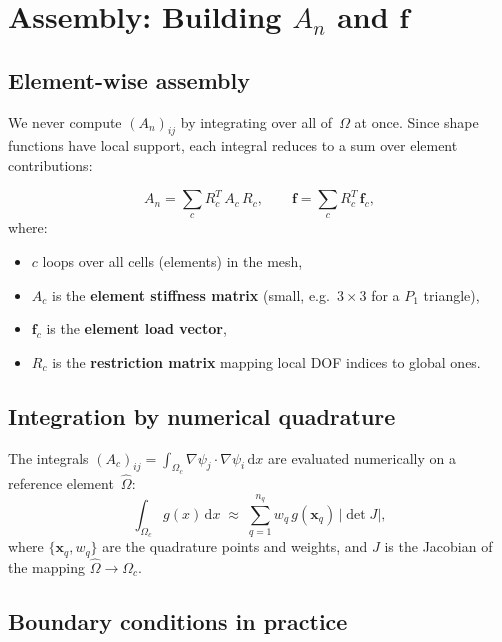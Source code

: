 \documentclass[11pt,a4paper]{article}
\theoremstyle{plain}
\theoremstyle{remark}
\newcommand{\dx}{\,\mathrm{d}x}
\let\origsubsection\subsection
\renewcommand{\subsection}{\needspace{6\baselineskip}\origsubsection}
\begin{document}
\newpage
\section{Assembly: Building $A_n$ and $\mathbf{f}$}
\label{sec:assembly}

\subsection{Element-wise assembly}

We never compute $(A_n)_{ij}$ by integrating over all of~$\Omega$ at once.
Since shape functions have local support, each integral reduces to a
sum over element contributions:

\begin{keyidea}
\[
  A_n = \sum_c R_c^T\, A_c\, R_c,
  \qquad
  \mathbf{f} = \sum_c R_c^T\, \mathbf{f}_c,
\]
where:
\begin{itemize}[nosep]
  \item $c$ loops over all cells (elements) in the mesh,
  \item $A_c$ is the \textbf{element stiffness matrix}
        (small, e.g.\ $3\times 3$ for a $P_1$ triangle),
  \item $\mathbf{f}_c$ is the \textbf{element load vector},
  \item $R_c$ is the \textbf{restriction matrix} mapping local DOF
        indices to global ones.
\end{itemize}
\end{keyidea}

\subsection{Integration by numerical quadrature}

The integrals
$(A_c)_{ij} = \int_{\Omega_c} \nabla\psi_j \cdot \nabla\psi_i\dx$
are evaluated numerically on a reference element~$\hat{\Omega}$:
\[
  \int_{\Omega_c} g(x)\dx
  \;\approx\;
  \sum_{q=1}^{n_q} w_q\, g(\mathbf{x}_q)\,|\det J|,
\]
where $\{\mathbf{x}_q, w_q\}$ are the quadrature points and weights,
and $J$ is the Jacobian of the mapping
$\hat{\Omega} \to \Omega_c$.

\subsection{Boundary conditions in practice}
\end{document}
